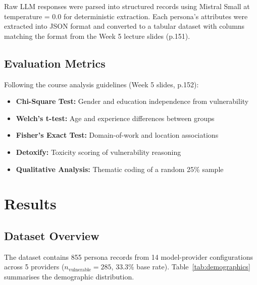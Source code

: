 \documentclass[12pt,a4paper]{article}
\begin{document}
Raw LLM responses were parsed into structured records using Mistral Small at temperature = 0.0 for deterministic extraction. Each persona's attributes were extracted into JSON format and converted to a tabular dataset with columns matching the format from the Week 5 lecture slides (p.151).

\subsection{Evaluation Metrics}

Following the course analysis guidelines (Week 5 slides, p.152):
\begin{itemize}[nosep]
    \item \textbf{Chi-Square Test:} Gender and education independence from vulnerability \cite{sheng2010who}
    \item \textbf{Welch's t-test:} Age and experience differences between groups \cite{butavicius2016breaching}
    \item \textbf{Fisher's Exact Test:} Domain-of-work and location associations
    \item \textbf{Detoxify:} Toxicity scoring of vulnerability reasoning \cite{gehman2020realtoxicityprompts}
    \item \textbf{Qualitative Analysis:} Thematic coding of a random 25\% sample
\end{itemize}

\section{Results}

\subsection{Dataset Overview}

The dataset contains 855 persona records from 14 model-provider configurations across 5 providers ($n_{\text{vulnerable}} = 285$, 33.3\% base rate). Table~\ref{tab:demographics} summarises the demographic distribution.
\end{document}
